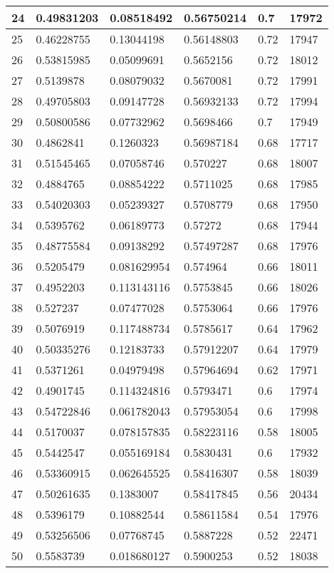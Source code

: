 \begin{longtable}{|l|l|l|l|l|l|}
24 & 0.49831203 & 0.08518492 & 0.56750214 & 0.7 & 17972 \\ \hline 
25 & 0.46228755 & 0.13044198 & 0.56148803 & 0.72 & 17947 \\ \hline 
26 & 0.53815985 & 0.05099691 & 0.5652156 & 0.72 & 18012 \\ \hline 
27 & 0.5139878 & 0.08079032 & 0.5670081 & 0.72 & 17991 \\ \hline 
28 & 0.49705803 & 0.09147728 & 0.56932133 & 0.72 & 17994 \\ \hline 
29 & 0.50800586 & 0.07732962 & 0.5698466 & 0.7 & 17949 \\ \hline 
30 & 0.4862841 & 0.1260323 & 0.56987184 & 0.68 & 17717 \\ \hline 
31 & 0.51545465 & 0.07058746 & 0.570227 & 0.68 & 18007 \\ \hline 
32 & 0.4884765 & 0.08854222 & 0.5711025 & 0.68 & 17985 \\ \hline 
33 & 0.54020303 & 0.05239327 & 0.5708779 & 0.68 & 17950 \\ \hline 
34 & 0.5395762 & 0.06189773 & 0.57272 & 0.68 & 17944 \\ \hline 
35 & 0.48775584 & 0.09138292 & 0.57497287 & 0.68 & 17976 \\ \hline 
36 & 0.5205479 & 0.081629954 & 0.574964 & 0.66 & 18011 \\ \hline 
37 & 0.4952203 & 0.113143116 & 0.5753845 & 0.66 & 18026 \\ \hline 
38 & 0.527237 & 0.07477028 & 0.5753064 & 0.66 & 17976 \\ \hline 
39 & 0.5076919 & 0.117488734 & 0.5785617 & 0.64 & 17962 \\ \hline 
40 & 0.50335276 & 0.12183733 & 0.57912207 & 0.64 & 17979 \\ \hline 
41 & 0.5371261 & 0.04979498 & 0.57964694 & 0.62 & 17971 \\ \hline 
42 & 0.4901745 & 0.114324816 & 0.5793471 & 0.6 & 17974 \\ \hline 
43 & 0.54722846 & 0.061782043 & 0.57953054 & 0.6 & 17998 \\ \hline 
44 & 0.5170037 & 0.078157835 & 0.58223116 & 0.58 & 18005 \\ \hline 
45 & 0.5442547 & 0.055169184 & 0.5830431 & 0.6 & 17932 \\ \hline 
46 & 0.53360915 & 0.062645525 & 0.58416307 & 0.58 & 18039 \\ \hline 
47 & 0.50261635 & 0.1383007 & 0.58417845 & 0.56 & 20434 \\ \hline 
48 & 0.5396179 & 0.10882544 & 0.58611584 & 0.54 & 17976 \\ \hline 
49 & 0.53256506 & 0.07768745 & 0.5887228 & 0.52 & 22471 \\ \hline 
50 & 0.5583739 & 0.018680127 & 0.5900253 & 0.52 & 18038 \\ \hline 
\end{longtable}